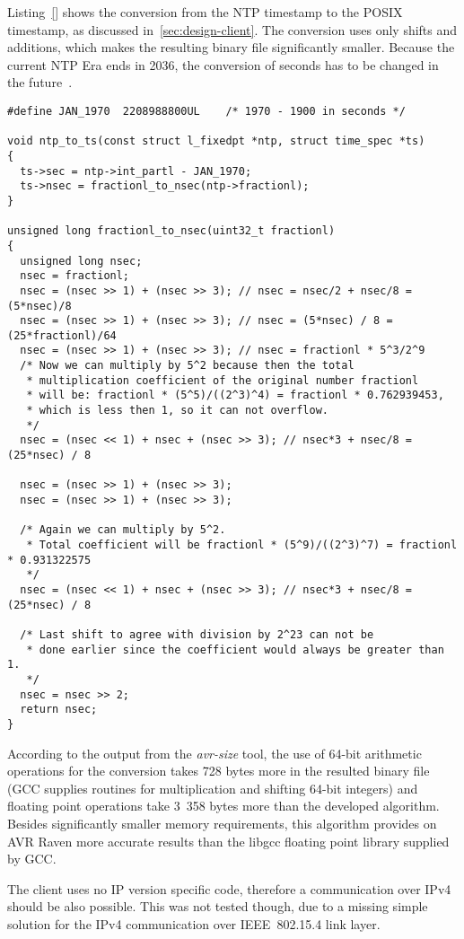 Listing~\ref{} shows the conversion from the NTP timestamp to the POSIX timestamp,
as discussed in~\ref{sec:design-client}.
The conversion uses only shifts and additions, which makes the resulting binary file
significantly smaller.
Because the current NTP Era ends in 2036,
the conversion of seconds has to be changed in the future~\cite{ntp-y2k}.
\begin{lstlisting}[caption={Conversion from NTP timestamp to POSIX timestamp},label={lst:implementation-conversion}]
#define	JAN_1970  2208988800UL    /* 1970 - 1900 in seconds */

void ntp_to_ts(const struct l_fixedpt *ntp, struct time_spec *ts)
{
  ts->sec = ntp->int_partl - JAN_1970;
  ts->nsec = fractionl_to_nsec(ntp->fractionl);
}

unsigned long fractionl_to_nsec(uint32_t fractionl)
{
  unsigned long nsec;
  nsec = fractionl;
  nsec = (nsec >> 1) + (nsec >> 3); // nsec = nsec/2 + nsec/8 = (5*nsec)/8
  nsec = (nsec >> 1) + (nsec >> 3); // nsec = (5*nsec) / 8 = (25*fractionl)/64
  nsec = (nsec >> 1) + (nsec >> 3); // nsec = fractionl * 5^3/2^9
  /* Now we can multiply by 5^2 because then the total
   * multiplication coefficient of the original number fractionl
   * will be: fractionl * (5^5)/((2^3)^4) = fractionl * 0.762939453,
   * which is less then 1, so it can not overflow.
   */
  nsec = (nsec << 1) + nsec + (nsec >> 3); // nsec*3 + nsec/8 = (25*nsec) / 8

  nsec = (nsec >> 1) + (nsec >> 3);
  nsec = (nsec >> 1) + (nsec >> 3);

  /* Again we can multiply by 5^2.
   * Total coefficient will be fractionl * (5^9)/((2^3)^7) = fractionl * 0.931322575
   */
  nsec = (nsec << 1) + nsec + (nsec >> 3); // nsec*3 + nsec/8 = (25*nsec) / 8

  /* Last shift to agree with division by 2^23 can not be
   * done earlier since the coefficient would always be greater than 1.
   */
  nsec = nsec >> 2;
  return nsec;
}
\end{lstlisting}
According to the output from the {\it{avr-size}} tool,
the use of 64-bit arithmetic operations for the conversion
takes 728 bytes more in the
resulted binary file (GCC supplies routines for multiplication and shifting 64-bit integers)
and floating point operations take 3~358 bytes more
than the developed algorithm.
Besides significantly smaller memory requirements,
this algorithm provides on AVR Raven more accurate results than the libgcc
floating point library supplied by GCC.

The client uses no IP version specific code,
therefore a communication over IPv4 should be also possible.
This was not tested though, due to a missing simple solution for
the IPv4 communication over IEEE~802.15.4 link layer.
